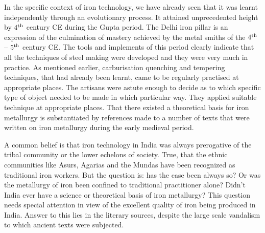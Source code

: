 In the specific context of iron technology, we have already seen that it was learnt independently through an evolutionary process. It attained unprecedented height by $4^{\rm th}$ century CE during the Gupta period. The Delhi iron pillar is an expression of the culmination of mastery achieved by the metal smiths of the $4^{\rm th}$ – $5^{\rm th}$ century CE. The tools and implements of this period clearly indicate that all the techniques of steel making were developed and they were very much in practice. As mentioned earlier, carburisation quenching and tempering techniques, that had already been learnt, came to be regularly practised at appropriate places. The artisans were astute enough to decide as to which specific type of object needed to be made in which particular way. They applied suitable technique at appropriate places. That there existed a theoretical basis for iron metallurgy is substantiated by references made to a number of texts that were written on iron metallurgy during the early medieval period.

A common belief is that iron technology in India was always prerogative of the tribal community or the lower echelons of society. True, that the ethnic communities like Asurs, Agarias and the Mundas have been recognized as traditional iron workers. But the question is: has the case been always so? Or was the metallurgy of iron been confined to traditional practitioner alone? Didn’t India ever have a science or theoretical basis of iron metallurgy?  This question needs special attention in view of the excellent quality of iron being produced in India. Answer to this lies in the literary sources, despite the large scale vandalism to which ancient texts were subjected. 

